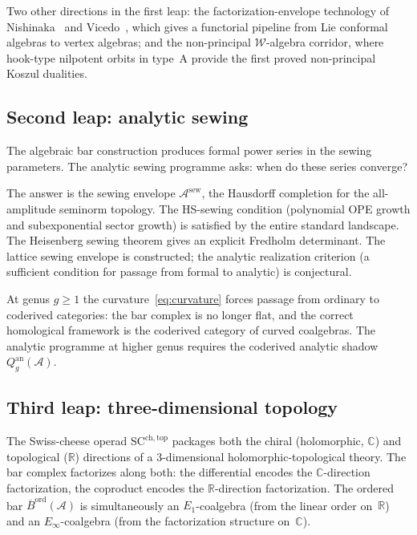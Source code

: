 \documentclass[11pt,reqno]{amsart}
\theoremstyle{definition}
\theoremstyle{remark}
\newcommand{\cA}{\mathcal{A}}
\newcommand{\cW}{\mathcal{W}}
\newcommand{\barB}{\overline{B}}
\numberwithin{equation}{section}
\begin{document}
Two other directions in the first leap: the
factorization-envelope technology of Nishinaka~\cite{Nis25} and Vicedo~\cite{Vic25},
which gives a functorial pipeline from Lie conformal
algebras to vertex algebras; and the non-principal
$\cW$-algebra corridor, where hook-type nilpotent orbits
in type~A provide the first proved non-principal Koszul
dualities.


\subsection{Second leap: analytic sewing}
\label{ssec:sewing-frontier}

The algebraic bar construction produces formal power
series in the sewing parameters. The analytic sewing
programme asks: when do these series converge?

The answer is the sewing envelope $\cA^{\mathrm{sew}}$,
the Hausdorff completion for the all-amplitude seminorm
topology. The HS-sewing condition (polynomial OPE growth
and subexponential sector growth) is satisfied by the
entire standard landscape. The Heisenberg sewing theorem
gives an explicit Fredholm determinant. The lattice
sewing envelope is constructed; the analytic realization
criterion (a sufficient condition for passage from
formal to analytic) is conjectural.

At genus $g \ge 1$ the curvature~\eqref{eq:curvature}
forces passage from ordinary to coderived categories:
the bar complex is no longer flat, and the correct
homological framework is the coderived category of
curved coalgebras. The analytic programme at higher genus
requires the coderived analytic shadow
$Q_g^{\mathrm{an}}(\cA)$.


\subsection{Third leap: three-dimensional topology}
\label{ssec:3d}

The Swiss-cheese operad $\mathrm{SC}^{\mathrm{ch,top}}$
packages both the chiral (holomorphic, $\mathbb{C}$)
and topological ($\mathbb{R}$) directions of a
$3$-dimensional holomorphic-topological theory. The
bar complex factorizes along both: the differential
encodes the $\mathbb{C}$-direction factorization, the
coproduct encodes the $\mathbb{R}$-direction
factorization. The ordered bar
$\barB^{\mathrm{ord}}(\cA)$ is simultaneously an
$E_1$-coalgebra (from the linear order on~$\mathbb{R}$)
and an $E_\infty$-coalgebra (from the factorization
structure on~$\mathbb{C}$).
\end{document}
